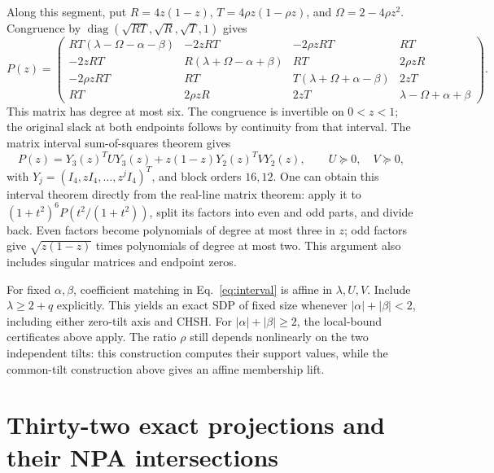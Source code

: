 \documentclass[11pt]{article}
\theoremstyle{remark}\newtheorem{remark}[theorem]{Remark}
\begin{document}
Along this segment, put
\(R=4z(1-z)\), \(T=4\rho z(1-\rho z)\), and \(\Omega=2-4\rho z^2\).
Congruence by \(\operatorname{diag}(\sqrt{RT},\sqrt R,\sqrt T,1)\) gives
\begin{equation}
 P(z)=
 \begin{pmatrix}
 RT(\lambda-\Omega-\alpha-\beta)&-2zRT&-2\rho zRT&RT\\
 -2zRT&R(\lambda+\Omega-\alpha+\beta)&RT&2\rho zR\\
 -2\rho zRT&RT&T(\lambda+\Omega+\alpha-\beta)&2zT\\
 RT&2\rho zR&2zT&\lambda-\Omega+\alpha+\beta
 \end{pmatrix}.
 \label{eq:rayP}
\end{equation}
This matrix has degree at most six. The congruence is invertible on \(0<z<1\);
the original slack at both endpoints follows by continuity from that interval.
The matrix interval sum-of-squares theorem gives
\begin{equation}
 P(z)=Y_3(z)^TUY_3(z)+z(1-z)Y_2(z)^TVY_2(z),\qquad
 U\succeq0,\quad V\succeq0,
 \label{eq:interval}
\end{equation}
with \(Y_j=(I_4,zI_4,\ldots,z^jI_4)^T\), and block orders \(16,12\).
One can obtain this interval theorem directly from the real-line matrix theorem:
apply it to \((1+t^2)^6P(t^2/(1+t^2))\), split its factors into even and odd parts,
and divide back. Even factors become polynomials of degree at most three in \(z\);
odd factors give \(\sqrt{z(1-z)}\) times polynomials of degree at most two.
This argument also includes singular matrices and endpoint zeros.

For fixed \(\alpha,\beta\), coefficient matching in Eq.~\eqref{eq:interval}
is affine in \(\lambda,U,V\). Include \(\lambda\ge2+q\) explicitly.
This yields an exact SDP of fixed size whenever
$|\alpha|+|\beta|<2$, including either zero-tilt axis and CHSH.
For $|\alpha|+|\beta|\ge2$, the local-bound certificates above apply.
The ratio \(\rho\) still depends nonlinearly on the two independent tilts:
this construction computes their support values, while the common-tilt
construction above gives an affine membership lift.


\section{Thirty-two exact projections and their NPA intersections}
\label{finite:sec:orbit}
\end{document}
